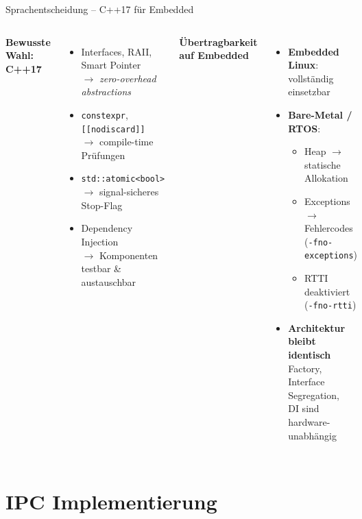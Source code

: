 \documentclass{beamer}
\begin{document}
\begin{frame}{Sprachentscheidung -- C++17 für Embedded}
\begin{columns}[T]
    \textbf{Bewusste Wahl: C++17}
    \begin{itemize}
        \item Interfaces, RAII, Smart Pointer\\
              $\rightarrow$ \textit{zero-overhead abstractions}
        \item \texttt{constexpr}, \texttt{[[nodiscard]]}\\
              $\rightarrow$ compile-time Prüfungen
        \item \texttt{std::atomic<bool>}\\
              $\rightarrow$ signal-sicheres Stop-Flag
        \item Dependency Injection\\
              $\rightarrow$ Komponenten testbar \& austauschbar
    \end{itemize}

    \textbf{Übertragbarkeit auf Embedded}
    \begin{itemize}
        \item \textbf{Embedded Linux}: vollständig einsetzbar
        \item \textbf{Bare-Metal / RTOS}:
        \begin{itemize}
            \item Heap $\rightarrow$ statische Allokation
            \item Exceptions $\rightarrow$ Fehlercodes (\texttt{-fno-exceptions})
            \item RTTI deaktiviert (\texttt{-fno-rtti})
        \end{itemize}
        \item \textbf{Architektur bleibt identisch}\\
              Factory, Interface Segregation,\\
              DI sind hardware-unabhängig
    \end{itemize}
\end{columns}
\end{frame}

\section{IPC Implementierung}
\end{document}
